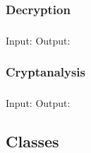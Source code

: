 \subsubsection{Decryption}
\begin{frame}
\frametitle{\bob}
Input: \decryptin \medskip
Output: \decryptout
\end{frame}

\subsubsection{Cryptanalysis}
\begin{frame}
\frametitle{\eve}
Input: \cryptanalyzein \medskip
Output: \cryptanalyzeout
\end{frame}


\subsection{Classes}
\lstset{language=C++} %
\newcommand{\csh}{../../src/\cs/\cs.h}

\begin{frame}
\frametitle{}
\codes{}
\end{frame}

\begin{frame}
\codes{}
\end{frame}

